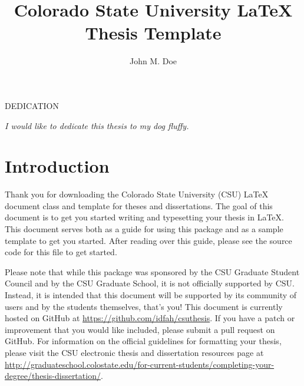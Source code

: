 \documentclass[master]{thesis}
\title{Colorado State University LaTeX Thesis Template}
\author{John M. Doe}
\begin{document}

\frontmatter %

\maketitle
\makemycopyright
\makeabstract
\makeacknowledgements
\tableofcontents
\listoftables %
\listoffigures %

\begin{center}

    DEDICATION

    \vfill %
    \noindent \textit{I would like to dedicate this thesis to my dog fluffy.}
    \vfill
\end{center}
\newpage

\mainmatter %

\chapter{Introduction}
\label{chap:intro}

Thank you for downloading the Colorado State University (CSU) \LaTeX{} document class and template for theses and dissertations.  The goal of this document is to get you started writing and typesetting your thesis in \LaTeX{}.  This document serves both as a guide for using this package and as a sample template to get you started.  After reading over this guide, please see the source code for this file to get started.

Please note that while this package was sponsored by the CSU Graduate Student Council and by the CSU Graduate School, it is not officially supported by CSU.  Instead, it is intended that this document will be supported by its community of users and by the students themselves, that's you!  This document is currently hosted on GitHub at \url{https://github.com/idfah/csuthesis}.  If you have a patch or improvement that you would like included, please submit a pull request on GitHub.  For information on the official guidelines for formatting your thesis, please visit the CSU electronic thesis and dissertation resources page at \url{http://graduateschool.colostate.edu/for-current-students/completing-your-degree/thesis-dissertation/}.
\end{document}
